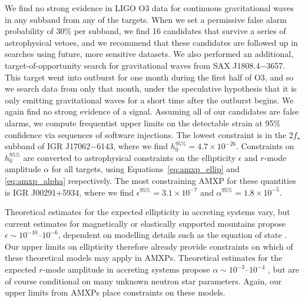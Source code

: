 We find no strong evidence in LIGO O3 data for continuous gravitational waves in any subband from any of the targets. When we set a permissive false alarm probability of 30\% per subband, we find 16 candidates that survive a series of astrophysical vetoes, and we recommend that these candidates are followed up in searches using future, more sensitive datasets. We also performed an additional, target-of-opportunity search for gravitational waves from SAX J1808.4$-$3657. This target went into outburst for one month during the first half of O3, and so we search data from only that month, under the speculative hypothesis that it is only emitting gravitational waves for a short time after the outburst begins. We again find no strong evidence of a signal. Assuming all of our candidates are false alarms, we compute frequentist upper limits on the detectable strain at 95\% confidence via sequences of software injections. The lowest constraint is in the $2f_\star$ subband of IGR J17062$-$6143, where we find $h_0^{95\%} = 4.7\times10^{-26}$. Constraints on $h_0^{95\%}$ are converted to astrophysical constraints on the ellipticity $\epsilon$ and $r$-mode amplitude $\alpha$ for all targets, using Equations~\eqref{eq:amxp_ellip} and \eqref{eq:amxp_alpha} respectively. The most constraining AMXP for these quantities is IGR J00291+5934, where we find $\epsilon^{95\%} = 3.1\times10^{-7}$ and $\alpha^{95\%} = 1.8\times10^{-5}$. 

Theoretical estimates for the expected ellipticity in accreting systems vary, but current estimates for magnetically or elastically supported mountains propose $\epsilon \sim 10^{-10}$--$10^{-6}$, dependent on modelling details such as the equation of state \citep{Haskell2006,Vigelius2009,Priymak2011,Gittins2021}. Our upper limits on ellipticity therefore already provide constraints on which of these theoretical models may apply in AMXPs. Theoretical estimates for the expected $r$-mode amplitude in accreting systems propose $\alpha \sim 10^{-3}$--$10^{-4}$ \citep{Bondarescu2009, Bondarescu2013}, but are of course conditional on many unknown neutron star parameters. Again, our upper limits from AMXPs place constraints on these models. 

